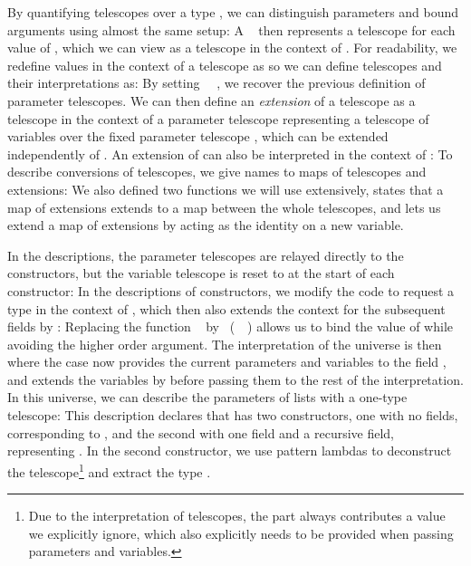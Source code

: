 By quantifying telescopes over a type \cite{practgen, sijsling}, we can distinguish parameters and bound arguments using almost the same setup:
A \  then represents a telescope for each value of , which we can view as a telescope in the context of . For readability, we redefine values in the context of a telescope as
so we can define telescopes and their interpretations as:
By setting \ \AV{=}\ , we recover the previous definition of parameter telescopes. We can then define an \emph{extension} of a telescope as a telescope in the context of a parameter telescope
representing a telescope of variables  over the fixed parameter telescope , which can be extended independently of . An extension of  can also be interpreted in the context of :
To describe conversions of telescopes, we give names to maps of telescopes and extensions:
We also defined two functions we will use extensively,  states that a map of extensions extends to a map between the whole telescopes, and  lets us extend a map of extensions by acting as the identity on a new variable. 

In the descriptions, the parameter telescopes are relayed directly to the constructors, but the variable telescope is reset to  at the start of each constructor:
In the descriptions of constructors, we modify the  code to request a type  in the context of , which then also extends the context for the subsequent fields by :
Replacing the function \  by \ (\ \ ) allows us to bind the value of  while avoiding the higher order argument. The interpretation of the universe is then
where the  case now provides the current parameters and variables to the field , and extends the variables by  before passing them to the rest of the interpretation. In this universe, we can describe the parameters of lists with a one-type telescope:
This description declares that  has two constructors, one with no fields, corresponding to \AIC{[]}, and the second with one field and a recursive field, representing . In the second constructor, we use pattern lambdas to deconstruct the telescope\footnote{Due to the interpretation of telescopes, the  part always contributes a value  we explicitly ignore, which also explicitly needs to be provided when passing parameters and variables.} and extract the type . 


